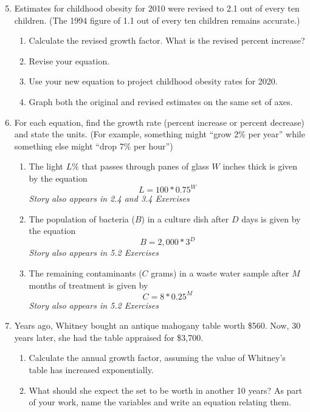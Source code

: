 \begin{enumerate} 
\setcounter{enumi}{4}

\item Estimates for childhood obesity for 2010 were revised to 2.1 out of every ten children.  (The 1994 figure of 1.1 out of every ten children remains accurate.)
\begin{enumerate}
\item Calculate the revised growth factor.  What is the revised percent increase?
\item Revise your equation.
\item Use your new equation to project childhood obesity rates for 2020.
\item Graph both the original and revised estimates on the same set of axes.  
\end{enumerate}

\item For each equation, find the growth rate (percent increase or percent decrease) and state the units. (For example, something might ``grow 2\% per year'' while something else might ``drop 7\% per hour'')  
\begin{enumerate} 
\item The light $L\%$ that passes through panes of glass $W$ inches thick is given by the equation
$$L = 100\ast 0.75^W$$
\hfill \emph{Story also appears in 2.4 and 3.4 Exercises}

\item The population of bacteria ($B$) in a culture dish after $D$ days is given by the equation $$B=2,000\ast 3^D$$
\hfill \emph{Story also appears in 5.2 Exercises}

\item The remaining contaminants ($C$ grams) in a waste water sample after $M$ months of treatment is given by $$C=8 \ast 0.25^M$$
\hfill \emph{Story also appears in 5.2 Exercises}
\end{enumerate}

\item Years ago, Whitney bought an antique mahogany table worth \$560.  Now, 30 years later, she had the table appraised for \$3,700.  
\begin{enumerate}
\item Calculate the annual growth factor, assuming the value of Whitney's table has increased exponentially.
\item What should she expect the set to be worth in another 10 years? As part of your work, name the variables and write an equation relating them.
\end{enumerate}


\end{enumerate}
